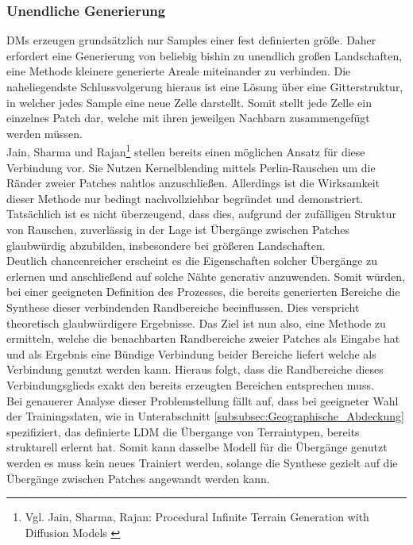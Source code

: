 \subsubsection {Unendliche Generierung}

\ac{DM}s erzeugen grundsätzlich nur Samples einer fest definierten größe. Daher erfordert eine Generierung von beliebig bishin zu unendlich großen Landschaften, eine Methode kleinere generierte Areale miteinander zu verbinden. Die naheliegendste Schlussvolgerung hieraus ist eine Lösung über eine Gitterstruktur, in welcher jedes Sample eine neue Zelle darstellt. Somit stellt jede Zelle ein einzelnes Patch dar, welche mit ihren jeweilgen Nachbarn zusammengefügt werden müssen. \\
Jain, Sharma und Rajan\footnote{
    Vgl. Jain, Sharma, Rajan: Procedural Infinite Terrain Generation with Diffusion Models
    \cite{jain2022adaptive}
} stellen bereits einen möglichen Ansatz für diese Verbindung vor. Sie Nutzen Kernelblending mittels Perlin-Rauschen um die Ränder zweier Patches nahtlos anzuschließen. Allerdings ist die Wirksamkeit dieser Methode nur bedingt nachvollziehbar begründet und demonstriert. Tatsächlich ist es nicht überzeugend, dass dies, aufgrund der zufälligen Struktur von Rauschen, zuverlässig in der Lage ist Übergänge zwischen Patches glaubwürdig abzubilden, insbesondere bei größeren Landschaften. \\
Deutlich chancenreicher erscheint es die Eigenschaften solcher Übergänge zu erlernen und anschließend auf solche Nähte generativ anzuwenden. Somit würden, bei einer geeigneten Definition des Prozesses, die bereits generierten Bereiche die Synthese dieser verbindenden Randbereiche beeinflussen. Dies verspricht theoretisch glaubwürdigere Ergebnisse. Das Ziel ist nun also, eine Methode zu ermitteln, welche die benachbarten Randbereiche zweier Patches als Eingabe hat und als Ergebnis eine Bündige Verbindung beider Bereiche liefert welche als Verbindung genutzt werden kann. Hieraus folgt, dass die Randbereiche dieses Verbindungsglieds exakt den bereits erzeugten Bereichen entsprechen muss. \\
Bei genauerer Analyse dieser Problemstellung fällt auf, dass bei geeigneter Wahl der Trainingsdaten, wie in Unterabschnitt \ref{subsubsec:Geographische_Abdeckung} spezifiziert, das definierte \ac{LDM} die Übergange von Terraintypen, bereits strukturell erlernt hat. Somit kann dasselbe Modell für die Übergänge genutzt werden es muss kein neues Trainiert werden, solange die Synthese gezielt auf die Übergänge zwischen Patches angewandt werden kann. \\
